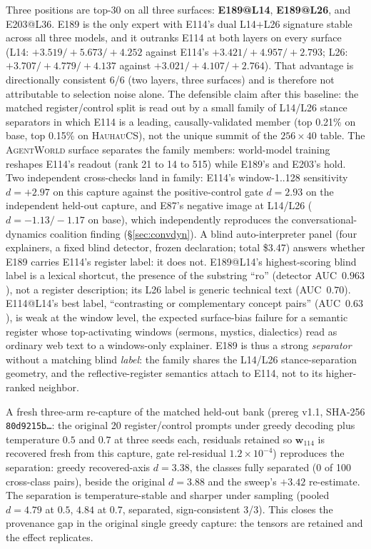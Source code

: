 \documentclass[10pt,a4paper,twocolumn]{article}
\newcommand{\wvec}{\mathbf{w}_{114}}
\begin{document}
Three positions are top-30 on all three surfaces: \textbf{E189@L14},
\textbf{E189@L26}, and E203@L36. E189 is the only expert with E114's dual
L14$+$L26 signature stable across all three models, and it outranks E114 at
both layers on every surface (L14: $+3.519/{+}5.673/{+}4.252$ against E114's
$+3.421/{+}4.957/{+}2.793$; L26: $+3.707/{+}4.779/{+}4.137$ against
$+3.021/{+}4.107/{+}2.764$). That advantage is directionally consistent 6/6
(two layers, three surfaces) and is therefore not attributable to selection
noise alone. The defensible claim after this baseline: the matched
register/control split is read out by a small family of L14/L26 stance
separators in which E114 is a leading, causally-validated member (top 0.21\%
on base, top 0.15\% on \textsc{HauhauCS}), not the unique summit of the
$256{\times}40$ table. The \textsc{AgentWorld} surface separates the family
members: world-model training reshapes E114's readout (rank 21 to 14 to 515)
while E189's and E203's hold. Two independent cross-checks land in family:
E114's window-1..128 sensitivity $d{=}{+}2.97$ on this capture against the
positive-control gate $d{=}2.93$ on the independent held-out capture, and
E87's negative image at L14/L26 ($d{=}{-}1.13/{-}1.17$ on base), which
independently reproduces the conversational-dynamics coalition finding
(\S\ref{sec:convdyn}). A blind auto-interpreter panel (four explainers, a fixed blind detector, frozen
declaration; total \$3.47) answers whether E189 carries E114's register label:
it does not. E189@L14's highest-scoring blind label is a lexical shortcut, the
presence of the substring ``ro'' (detector AUC~$0.963$), not a register
description; its L26 label is generic technical text (AUC~$0.70$). E114@L14's
best label, ``contrasting or complementary concept pairs'' (AUC~$0.63$), is
weak at the window level, the expected surface-bias failure for a semantic
register whose top-activating windows (sermons, mystics, dialectics) read as
ordinary web text to a windows-only explainer. E189 is thus a strong
\emph{separator} without a matching blind \emph{label}: the family shares the
L14/L26 stance-separation geometry, and the reflective-register semantics
attach to E114, not to its higher-ranked neighbor.

A fresh three-arm re-capture of the matched held-out bank (prereg v1.1, SHA-256
\texttt{80d9215b\ldots}: the original 20 register/control prompts under greedy
decoding plus temperature $0.5$ and $0.7$ at three seeds each, residuals
retained so $\wvec$ is recovered fresh from this capture, gate rel-residual
$1.2\times10^{-4}$) reproduces the separation: greedy recovered-axis
$d{=}3.38$, the classes fully separated (0 of 100 cross-class pairs), beside the
original $d{=}3.88$ and the sweep's $+3.42$ re-estimate. The separation is
temperature-stable and sharper under sampling (pooled $d{=}4.79$ at $0.5$,
$4.84$ at $0.7$, separated, sign-consistent 3/3). This closes the provenance
gap in the original single greedy capture: the tensors are retained and the
effect replicates.
\end{document}
